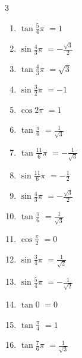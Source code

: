 \begin{multicols}{3}
\begin{enumerate}
  \item $\displaystyle \tan{\frac{5}{4}\pi}$
        $\displaystyle =1$

  \item $\displaystyle \sin{\frac{4}{3}\pi}$
        $\displaystyle =-\frac{\sqrt{3}}{2}$

  \item $\displaystyle \tan{\frac{4}{3}\pi}$
        $\displaystyle =\sqrt{3}$

  \item $\displaystyle \sin{\frac{3}{2}\pi}$
        $\displaystyle =-1$

  \item $\displaystyle \cos{2\pi}$
        $\displaystyle =1$

  \item $\displaystyle \tan{\frac{\pi}{6}}$
        $\displaystyle =\frac{1}{\sqrt{3}}$

  \item $\displaystyle \tan{\frac{11}{6}\pi}$
        $\displaystyle =-\frac{1}{\sqrt{3}}$

  \item $\displaystyle \sin{\frac{11}{6}\pi}$
        $\displaystyle =-\frac{1}{2}$

  \item $\displaystyle \sin{\frac{4}{3}\pi}$
        $\displaystyle =-\frac{\sqrt{3}}{2}$

  \item $\displaystyle \tan{\frac{\pi}{6}}$
        $\displaystyle =\frac{1}{\sqrt{3}}$

  \item $\displaystyle \cos{\frac{\pi}{2}}$
        $\displaystyle =0$

  \item $\displaystyle \sin{\frac{3}{4}\pi}$
        $\displaystyle =\frac{1}{\sqrt{2}}$

  \item $\displaystyle \sin{\frac{5}{4}\pi}$
        $\displaystyle =-\frac{1}{\sqrt{2}}$

  \item $\displaystyle \tan{0}$
        $\displaystyle =0$

  \item $\displaystyle \tan{\frac{\pi}{4}}$
        $\displaystyle =1$

  \item $\displaystyle \tan{\frac{7}{6}\pi}$
        $\displaystyle =\frac{1}{\sqrt{3}}$

\columnbreak %


\end{enumerate}
\end{multicols}
